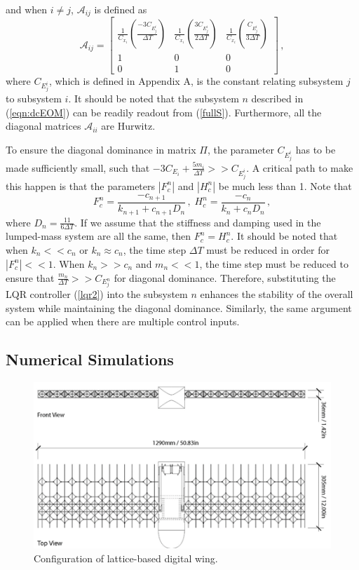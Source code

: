 \documentclass[11pt]{ucthesis}
\begin{document}
and when $i \neq j$, $\mathcal{A}_{ij}$ is defined as 
\[
\mathcal{A}_{ij} = \begin{bmatrix}
\frac{1}{C_{x_i}}\left(\frac{-3C_{E^i_j}}{\Delta T}\right)&\frac{1}{C_{x_i}}\left(\frac{3C_{E^i_j}}{2\Delta T}\right)&\frac{1}{C_{x_i}}\left(\frac{C_{E^i_j}}{3\Delta T}\right)\\1&0&0\\0&1&0
\end{bmatrix}\,,
\]
where $C_{E_j^i}$, which is defined in Appendix A, is the constant relating subsystem $j$ to subsystem $i$. It should be noted that the subsystem $n$ described in (\ref{eqn:dcEOM}) can be readily readout from (\ref{fullS}). Furthermore, all the diagonal matrices $\mathcal{A}_{ii}$ are Hurwitz. 

To ensure the diagonal dominance in matrix $\Pi$, the parameter $C_{E_j^i}$ has to be made sufficiently small, such that $-3C_{E_i}+\frac{5 m_i}{\Delta T}>> C_{E_j^i}$. A critical path to make this happen is that the parameters $|F_{c}^{n}|$ and $|H_{c}^{n}|$ be much less than 1. Note that
\[
F_c^n = \frac{-c_{n+1}}{k_{n+1} + c_{n+1}D_n}  \,,\; H_c^n = \frac{-c_{n}}{k_{n} + c_{n}D_n}\,,
\]
where $D_n = \frac{11}{6 \Delta T}$. If we assume that the stiffness and damping used in the lumped-mass system are all the same, then $F_c^n = H_c^n$. It should be noted that when $k_n << c_n$ or $k_n \approx c_n$, the time step $\Delta T$ must be reduced in order for $|F_{c}^{n}| << 1$. When $k_n >> c_n$ and $m_n << 1$, the time step must be reduced to ensure that $\frac{m_n}{\Delta T}>>C_{E^n_j}$ for diagonal dominance. Therefore, substituting the LQR controller (\ref{lqr2}) into the subsystem $n$ enhances the stability of the overall system while maintaining the diagonal dominance. Similarly, the same argument can be applied when there are multiple control inputs. 

\subsection{Numerical Simulations}
\label{sec:results}

\begin{figure}[h]
\centering
\includegraphics[width=1\linewidth]{Figures/WingConfiguration.png}
\caption{Configuration of lattice-based digital wing.}
\label{fig:WingConfig}
\end{figure}
\end{document}
